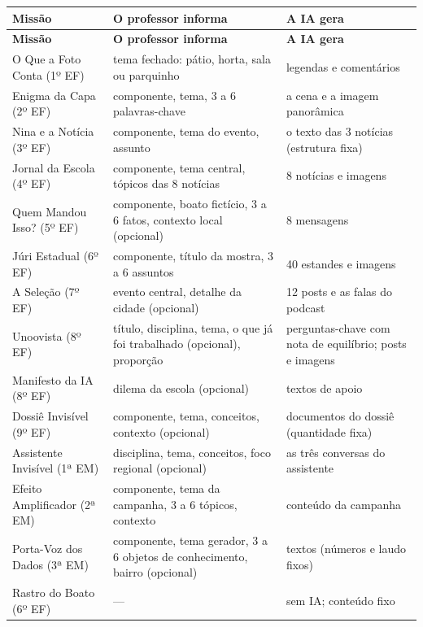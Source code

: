 \begin{center}
\footnotesize\renewcommand{\arraystretch}{1.3}
\begin{tabularx}{\linewidth}{@{}L{34mm}L{58mm}X@{}}
\caption{Entradas do professor e o que a IA gera, por missão}\label{tab:p02}\\
\toprule
\textbf{Missão} & \textbf{O professor informa} & \textbf{A IA gera}\\
\midrule
\endfirsthead
\toprule
\textbf{Missão} & \textbf{O professor informa} & \textbf{A IA gera}\\
\midrule
\endhead
O Que a Foto Conta (1º EF) & tema fechado: pátio, horta, sala ou parquinho
  & legendas e comentários\\
Enigma da Capa (2º EF) & componente, tema, 3 a 6 palavras-chave
  & a cena e a imagem panorâmica\\
Nina e a Notícia (3º EF) & componente, tema do evento, assunto
  & o texto das 3 notícias (estrutura fixa)\\
Jornal da Escola (4º EF) & componente, tema central, tópicos das 8 notícias
  & 8 notícias e imagens\\
Quem Mandou Isso? (5º EF) & componente, boato fictício, 3 a 6 fatos, contexto
  local (opcional) & 8 mensagens\\
Júri Estadual (6º EF) & componente, título da mostra, 3 a 6 assuntos
  & 40 estandes e imagens\\
A Seleção (7º EF) & evento central, detalhe da cidade (opcional)
  & 12 posts e as falas do podcast\\
Unoovista (8º EF) & título, disciplina, tema, o que já foi trabalhado
  (opcional), proporção & perguntas-chave com nota de equilíbrio; posts e
  imagens\\
Manifesto da IA (8º EF) & dilema da escola (opcional) & textos de apoio\\
Dossiê Invisível (9º EF) & componente, tema, conceitos, contexto (opcional)
  & documentos do dossiê (quantidade fixa)\\
Assistente Invisível (1ª EM) & disciplina, tema, conceitos, foco regional
  (opcional) & as três conversas do assistente\\
Efeito Amplificador (2ª EM) & componente, tema da campanha, 3 a 6 tópicos,
  contexto & conteúdo da campanha\\
Porta-Voz dos Dados (3ª EM) & componente, tema gerador, 3 a 6 objetos de
  conhecimento, bairro (opcional) & textos (números e laudo fixos)\\
Rastro do Boato (6º EF) & --- & sem IA; conteúdo fixo\\
\bottomrule
\end{tabularx}
\end{center}

